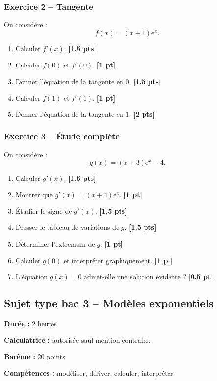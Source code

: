 \documentclass[11pt,a4paper]{article}
\newcommand{\e}{\mathrm{e}}
\newcommand{\pts}[1]{\hfill \textbf{[#1 pt]}}
\newcommand{\ptss}[1]{\hfill \textbf{[#1 pts]}}
\newcommand{\competences}[1]{\textbf{Compétences :} #1}
\newcommand{\calculatrice}{\textbf{Calculatrice :} autorisée sauf mention contraire.}
\newcommand{\duree}[1]{\textbf{Durée :} #1}
\newcommand{\bareme}[1]{\textbf{Barème :} #1}
\begin{document}
\subsubsection*{Exercice 2 -- Tangente}

On considère :
\[
f(x)=(x+1)\e^x.
\]
\begin{enumerate}
    \item Calculer $f'(x)$. \ptss{1.5}
    \item Calculer $f(0)$ et $f'(0)$. \pts{1}
    \item Donner l'équation de la tangente en $0$. \ptss{1.5}
    \item Calculer $f(1)$ et $f'(1)$. \pts{1}
    \item Donner l'équation de la tangente en $1$. \ptss{2}
\end{enumerate}

\subsubsection*{Exercice 3 -- Étude complète}

On considère :
\[
g(x)=(x+3)\e^x-4.
\]
\begin{enumerate}
    \item Calculer $g'(x)$. \ptss{1.5}
    \item Montrer que $g'(x)=(x+4)\e^x$. \pts{1}
    \item Étudier le signe de $g'(x)$. \ptss{1.5}
    \item Dresser le tableau de variations de $g$. \ptss{1.5}
    \item Déterminer l'extremum de $g$. \pts{1}
    \item Calculer $g(0)$ et interpréter graphiquement. \pts{1}
    \item L'équation $g(x)=0$ admet-elle une solution évidente ? \pts{0.5}
\end{enumerate}

\newpage

\subsection*{Sujet type bac 3 -- Modèles exponentiels}

\begin{sujetbox}
\duree{2 heures}

\calculatrice

\bareme{20 points}

\competences{modéliser, dériver, calculer, interpréter.}
\end{sujetbox}
\end{document}
